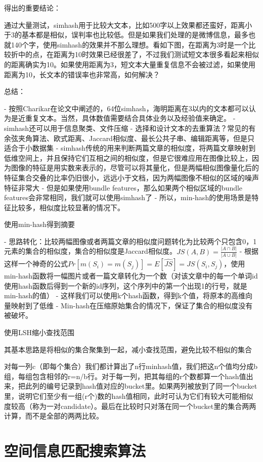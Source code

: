 得出的重要结论：

通过大量测试，simhash用于比较大文本，比如500字以上效果都还蛮好，距离小于3的基本都是相似，误判率也比较低。但是如果我们处理的是微博信息，最多也就140个字，使用simhash的效果并不那么理想。看如下图，在距离为3时是一个比较折中的点，在距离为10时效果已经很差了，不过我们测试短文本很多看起来相似的距离确实为10。如果使用距离为3，短文本大量重复信息不会被过滤，如果使用距离为10，长文本的错误率也非常高，如何解决？

总结：

- 按照Charikar在论文中阐述的，64位simhash，海明距离在3以内的文本都可以认为是近重复文本。当然，具体数值需要结合具体业务以及经验值来确定。 
- simhash还可以用于信息聚类、文件压缩
- 选择和设计文本的去重算法？常见的有余弦夹角算法、欧式距离、Jaccard相似度、最长公共子串、编辑距离等，但是只适合于小数据集
- simhash传统的用来判断两篇文章的相似度，将两篇文章映射到低维空间上，并且保持它们互相之间的相似度，但是它很难应用在图像比较上，因为图像的特征是用实数来表示的，尽管可以将其量化，但是两幅相似图像量化后的特征集合交叠的比率仍旧很小，远远小于文档，因为两幅图像不相似的区域的噪声特征非常大
- 但是如果使用bundle features，那么如果两个相似区域的bundle features会非常相同，我们就可以使用simhash了
- 所以，min-hash的使用场景是特征比较多，相似度比较显著的情况下。


使用min-hash得到摘要

- 思路转化：比较两幅图像或者两篇文章的相似度问题转化为比较两个只包含0，1元素的集合的相似度，集合的相似度是Jaccard相似度。\(JS(A,B)=\frac{|A\cap{B}|}{|A\cup{B}|}\)
- 根据这样一个神奇的公式\(Pr[m(S_i) = m(S_j)] = E[\hat{JS}] =JS(S_i,S_j)\)，使用min-hash函数将一幅图片或者一篇文章转化为一个数（对该文章中的每一个单词id使用hash函数后得到一个新的id序列，这个序列中的第一个出现1的行号，就是min-hash的值）
- 这样我们可以使用k个hash函数，得到k个值，将原本的高维向量映射到了低维
- Min-hash在压缩原始集合的情况下，保证了集合的相似度没有被破坏。

使用LSH缩小查找范围

其基本思路是将相似的集合聚集到一起，减小查找范围，避免比较不相似的集合

对每一列c（即每个集合）我们都计算出了n行minhash值，我们把这n个值均分成b组，每组包含相邻的r=n/b行。对于每一列，把其每组的r个数都算一个hash值出来，把此列的编号记录到hash值对应的bucket里。如果两列被放到了同一个bucket里，说明它们至少有一组(r个)数的hash值相同，此时可认为它们有较大可能相似度较高（称为一对candidate）。最后在比较时只对落在同一个bucket里的集合两两计算，而不是全部的两两比较。

\section{空间信息匹配搜索算法}


